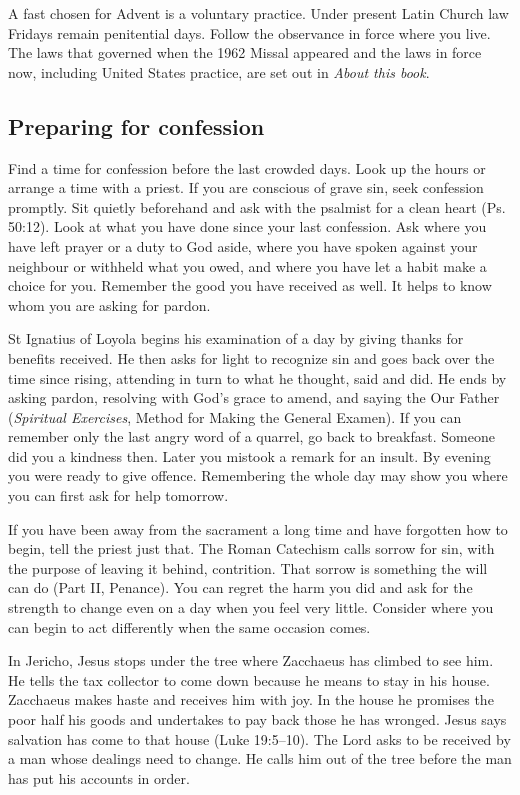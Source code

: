 A fast chosen for Advent is a voluntary practice. Under present
Latin Church law Fridays remain penitential days. Follow the
observance in force where you live. The laws that governed when
the 1962 Missal appeared and the laws in force now, including United
States practice, are set out in \emph{About this book}.

\subsection{Preparing for confession}

Find a time for confession before the last crowded days. Look up the hours
or arrange a time with a priest. If you are conscious of grave sin, seek
confession promptly. Sit quietly beforehand and ask with the psalmist for
a clean heart (Ps. 50:12). Look at what you have done since your last
confession. Ask where you have left prayer or a duty to God aside, where
you have spoken against your neighbour or withheld what you owed, and
where you have let a habit make a choice for you. Remember the good you
have received as well. It helps to know whom you are asking for pardon.

St Ignatius of Loyola begins his examination of a day by giving thanks
for benefits received. He then asks for light to recognize sin and goes
back over the time since rising, attending in turn to what he thought,
said and did. He ends by asking pardon, resolving with God's grace to
amend, and saying the Our Father (\emph{Spiritual Exercises}, Method
for Making the General Examen). If you can remember only the last angry
word of a quarrel, go back to breakfast. Someone did you a kindness
then. Later you mistook a remark for an insult. By evening you were
ready to give offence. Remembering the whole day may show you where
you can first ask for help tomorrow.

If you have been away from the sacrament a long time and have
forgotten how to begin, tell the priest just that. The Roman Catechism
calls sorrow for sin, with the purpose of leaving it behind, contrition.
That sorrow is something the will can do (Part II, Penance). You can
regret the harm you did and ask for the strength to change even on a
day when you feel very little. Consider where you can begin to act
differently when the same occasion comes.

In Jericho, Jesus stops under the tree where Zacchaeus has climbed to see
him. He tells the tax collector to come down because he means to stay in
his house. Zacchaeus makes haste and receives him with joy. In the house
he promises the poor half his goods and undertakes to pay back those he
has wronged. Jesus says salvation has come to that house (Luke 19:5--10).
The Lord asks to be received by a man whose dealings need to change.
He calls him out of the tree before the man has put his accounts in order.

